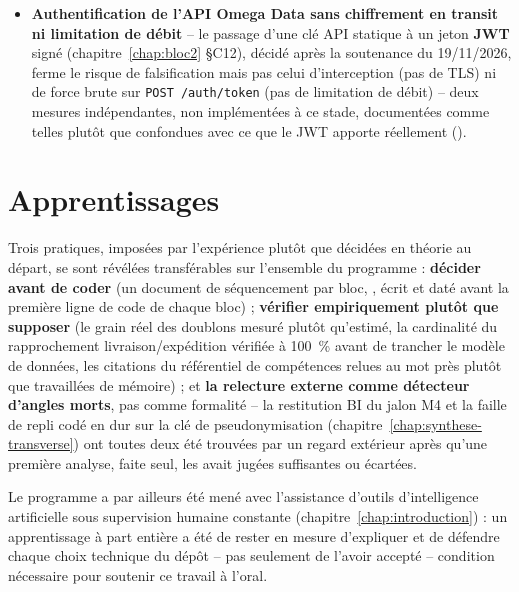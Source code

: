 \begin{itemize}
  \item \textbf{Authentification de l'API Omega Data sans chiffrement
    en transit ni limitation de débit} -- le passage d'une clé API
    statique à un jeton \textbf{JWT} signé (chapitre~\ref{chap:bloc2}
    §C12), décidé après la soutenance du 19/11/2026, ferme le risque de
    falsification mais pas celui d'interception (pas de TLS) ni de
    force brute sur \texttt{POST~/auth/token} (pas de limitation de
    débit) -- deux mesures indépendantes, non implémentées à ce stade,
    documentées comme telles plutôt que confondues avec ce que le JWT
    apporte réellement
    ().
\end{itemize}

\section{Apprentissages}

Trois pratiques, imposées par l'expérience plutôt que décidées en
théorie au départ, se sont révélées transférables sur l'ensemble du
programme : \textbf{décider avant de coder} (un document de
séquencement par bloc, ,
écrit et daté avant la première ligne de code de chaque bloc) ;
\textbf{vérifier empiriquement plutôt que supposer} (le grain réel des
doublons mesuré plutôt qu'estimé, la cardinalité du rapprochement
livraison/expédition vérifiée à 100~\% avant de trancher le modèle de
données, les citations du référentiel de compétences relues au mot
près plutôt que travaillées de mémoire) ; et \textbf{la relecture
externe comme détecteur d'angles morts}, pas comme formalité -- la
restitution BI du jalon M4 et la faille de repli codé en dur sur la
clé de pseudonymisation (chapitre~\ref{chap:synthese-transverse}) ont
toutes deux été trouvées par un regard extérieur après qu'une première
analyse, faite seul, les avait jugées suffisantes ou écartées.

Le programme a par ailleurs été mené avec l'assistance d'outils
d'intelligence artificielle sous supervision humaine constante
(chapitre~\ref{chap:introduction}) : un apprentissage à part entière a
été de rester en mesure d'expliquer et de défendre chaque choix
technique du dépôt -- pas seulement de l'avoir accepté -- condition
nécessaire pour soutenir ce travail à l'oral.
